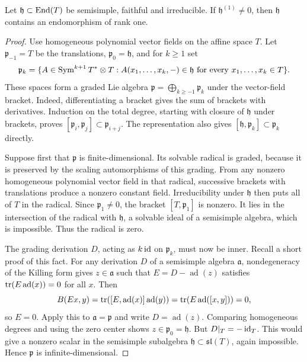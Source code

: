 \begin{lemma}
\label{loc:rank-one-symbol}
Let $\mathfrak h\subset\operatorname{End}(T)$ be semisimple, faithful and
irreducible.  If $\mathfrak h^{(1)}\ne0$, then
$\mathfrak h$ contains an endomorphism of rank one.
\end{lemma}

\begin{proof}
Use homogeneous polynomial vector fields on the affine space $T$.
Let $\mathfrak p_{-1}=T$ be the translations,
$\mathfrak p_0=\mathfrak h$, and for $k\ge1$ set
\[
 \mathfrak p_k=
 \{A\in\operatorname{Sym}^{k+1}T^*\otimes T:
   A(x_1,\ldots,x_k,{-})\in\mathfrak h
                       \text{ for every }x_1,\ldots,x_k\in T\}.
\]
These spaces form a graded Lie algebra
$\mathfrak p=\bigoplus_{k\ge-1}\mathfrak p_k$ under the
vector-field bracket.  Indeed, differentiating a bracket gives the
sum of brackets with derivatives.  Induction on the total degree,
starting with closure of $\mathfrak h$ under brackets, proves
$[\mathfrak p_i,\mathfrak p_j]\subset\mathfrak p_{i+j}$.
The representation also gives
$[\mathfrak h,\mathfrak p_k]\subset\mathfrak p_k$ directly.

Suppose first that $\mathfrak p$ is finite-dimensional.  Its
solvable radical is graded, because it is preserved by the scaling
automorphisms of this grading.  From any nonzero homogeneous
polynomial vector field in that radical, successive brackets with
translations produce a nonzero constant field.  Irreducibility
under $\mathfrak h$ then puts all of $T$ in the radical.  Since
$\mathfrak p_1\ne0$, the bracket
$[T,\mathfrak p_1]$ is nonzero.  It lies in the intersection of
the radical with $\mathfrak h$, a solvable ideal of a semisimple
algebra, which is impossible.  Thus the radical is zero.

The grading derivation $D$, acting as $k\operatorname{id}$ on
$\mathfrak p_k$, must now be inner.  Recall a short proof of this
fact.  For any derivation $D$ of a semisimple algebra $\mathfrak a$,
nondegeneracy of the Killing form gives $z\in\mathfrak a$ such that
$E=D-\operatorname{ad}(z)$ satisfies
$\operatorname{tr}(E\operatorname{ad}(x))=0$ for all $x$.  Then
\[
 B(Ex,y)=\operatorname{tr}([E,\operatorname{ad}(x)]\operatorname{ad}(y))
        =\operatorname{tr}(E\operatorname{ad}([x,y]))=0,
\]
so $E=0$.  Apply this to $\mathfrak a=\mathfrak p$ and write
$D=\operatorname{ad}(z)$.  Comparing homogeneous degrees and
using the zero center shows $z\in\mathfrak p_0=\mathfrak h$.
But $D|_T=-\operatorname{id}_T$.  This would give a nonzero scalar in the
semisimple subalgebra $\mathfrak h\subset\mathfrak{sl}(T)$,
again impossible.  Hence $\mathfrak p$ is infinite-dimensional.


\end{proof}
